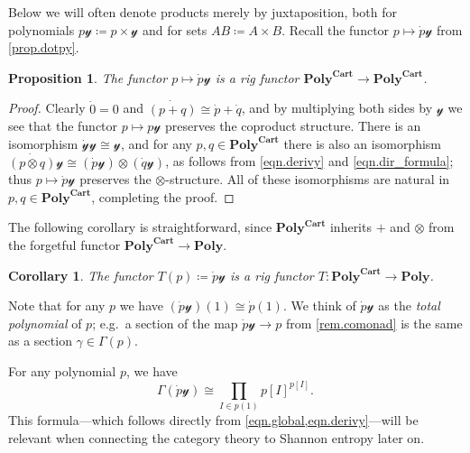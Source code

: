 \documentclass[11pt, one side, article]{memoir}
\theoremstyle{definition}
\theoremstyle{plain}
\newtheorem{proposition}[definitionx]{Proposition}
\newtheorem{corollary}[definitionx]{Corollary}
\newenvironment{example}
  {\pushQED{\qed}\renewcommand{\qedsymbol}{$\lozenge$}\examplex}
  {\popQED\endexamplex}
\newenvironment{remark}
  {\pushQED{\qed}\renewcommand{\qedsymbol}{$\lozenge$}\remarkx}
  {\popQED\endremarkx}
\newcommand{\Cat}[1]{\mathbf{#1}}%
\newcommand{\yon}{\mathcal{y}}
\newcommand{\poly}{\Cat{Poly}}
\newcommand{\polycart}{\poly^{\Cat{Cart}}}
\newcommand{\0}{\textsf{0}}
\newcommand{\1}{\tn{\textsf{1}}}
\newcommand{\T}{T}
\begin{document}
Below we will often denote products merely by juxtaposition, both for polynomials $p\yon\coloneqq p\times \yon$ and for sets $AB\coloneqq A\times B$. Recall the functor $p\mapsto\dot{p}\yon$ from \cref{prop.dotpy}.

\begin{proposition}
The functor $p\mapsto\dot{p}\yon$ is a rig functor $\polycart\to\polycart$. 
\end{proposition}
\begin{proof}
Clearly $\dot{0}=0$ and $\dot{(p+q)}\cong\dot{p}+\dot{q}$, and by multiplying both sides by $\yon$ we see that the functor $p\mapsto p\yon$ preserves the coproduct structure. There is an isomorphism $\dot{\yon}\yon\cong\yon$, and for any $p,q\in\polycart$ there is also an isomorphism $\dot{(p\otimes q)}\yon\cong(\dot{p}\yon)\otimes(\dot{q}\yon)$, as follows from \eqref{eqn.derivy} and \eqref{eqn.dir_formula}; thus $p\mapsto\dot{p}\yon$ preserves the $\otimes$-structure. All of these isomorphisms are natural in $p,q\in\polycart$, completing the proof.
\end{proof}

The following corollary is straightforward, since $\polycart$ inherits $+$ and $\otimes$ from the forgetful functor $\polycart\to\poly$.

\begin{corollary}\label{cor.D}
The functor $\T(p)\coloneqq\dot{p}\yon$ is a rig functor $\T\colon\polycart\to\poly$. 
\end{corollary}

\begin{remark}[Total polynomial]\label{rem.total}
Note that for any $p$ we have $(\dot{p}\yon)(1)\cong\dot{p}(1)$. We think of $\dot{p}\yon$ as the \emph{total polynomial} of $p$; e.g.\ a section of the map $\dot{p}\yon\to p$ from \cref{rem.comonad} is the same as a section $\gamma\in\Gamma(p)$.
\end{remark}


\begin{example}\label{ex.global_D}
For any polynomial $p$, we have
\[
\Gamma(\dot{p}\yon)\cong\prod_{I\in p(1)}p[I]^{p[I]}.
\]
This formula---which follows directly from \cref{eqn.global,eqn.derivy}---will be relevant when connecting the category theory to Shannon entropy later on. 
\end{example}
\end{document}
